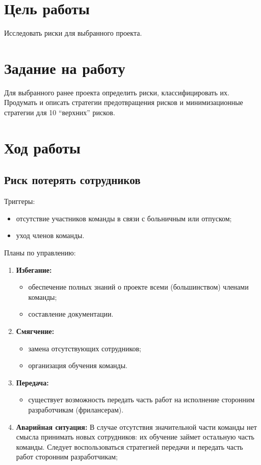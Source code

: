 \documentclass[a4paper,14pt]{extarticle}
\begin{document}


\section{Цель работы}
Исследовать риски для выбранного проекта.

\section{Задание на работу}
Для выбранного ранее проекта определить риски, классифицировать их. Продумать и
описать стратегии предотвращения рисков и минимизационные стратегии для 10
\enquote{верхних} рисков.

\section{Ход работы}
\subsection{Риск потерять сотрудников}
Триггеры:
\begin{itemize}
    \item отсутствие участников команды в связи с больничным или отпуском;
    \item уход членов команды.
\end{itemize}

Планы по управлению:
\begin{enumerate}
    \item \textbf{Избегание:}
    \begin{itemize}
        \item обеспечение полных знаний о проекте всеми (большинством) членами команды;
        \item составление документации.
    \end{itemize}

    \item \textbf{Смягчение:}
    \begin{itemize}
        \item замена отсутствующих сотрудников;
        \item организация обучения команды.
    \end{itemize}

    \item \textbf{Передача:}
    \begin{itemize}
        \item существует возможность передать часть работ на исполнение
              сторонним разработчикам (фрилансерам).
    \end{itemize}

    \item \textbf{Аварийная ситуация:} В случае отсутствия значительной части
          команды нет смысла принимать новых сотрудников: их обучение займет
          остальную часть команды. Следует воспользоваться стратегией передачи и
          передать часть работ сторонним разработчикам;
\end{enumerate}
\end{document}
